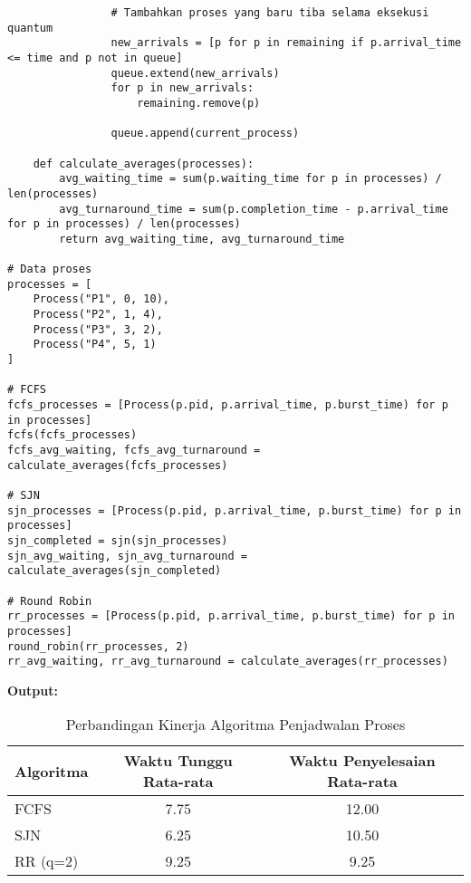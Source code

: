 \documentclass[12pt]{article}
\begin{document}
\begin{lstlisting}
                # Tambahkan proses yang baru tiba selama eksekusi quantum
                new_arrivals = [p for p in remaining if p.arrival_time <= time and p not in queue]
                queue.extend(new_arrivals)
                for p in new_arrivals:
                    remaining.remove(p)
                
                queue.append(current_process)

    def calculate_averages(processes):
        avg_waiting_time = sum(p.waiting_time for p in processes) / len(processes)
        avg_turnaround_time = sum(p.completion_time - p.arrival_time for p in processes) / len(processes)
        return avg_waiting_time, avg_turnaround_time

# Data proses
processes = [
    Process("P1", 0, 10),
    Process("P2", 1, 4),
    Process("P3", 3, 2),
    Process("P4", 5, 1)
]

# FCFS
fcfs_processes = [Process(p.pid, p.arrival_time, p.burst_time) for p in processes]
fcfs(fcfs_processes)
fcfs_avg_waiting, fcfs_avg_turnaround = calculate_averages(fcfs_processes)

# SJN
sjn_processes = [Process(p.pid, p.arrival_time, p.burst_time) for p in processes]
sjn_completed = sjn(sjn_processes)
sjn_avg_waiting, sjn_avg_turnaround = calculate_averages(sjn_completed)

# Round Robin
rr_processes = [Process(p.pid, p.arrival_time, p.burst_time) for p in processes]
round_robin(rr_processes, 2)
rr_avg_waiting, rr_avg_turnaround = calculate_averages(rr_processes)
\end{lstlisting}

\textbf{Output:}

\begin{table}[h]
    \centering
    \begin{tabular}{|l|c|c|}
    \hline
    \textbf{Algoritma} & \textbf{Waktu Tunggu Rata-rata} & \textbf{Waktu Penyelesaian Rata-rata} \\
    \hline
    FCFS               & 7.75                           & 12.00                                \\
    SJN                & 6.25                           & 10.50                                \\
    RR (q=2)           & 9.25                           & 9.25                                 \\
    \hline
    \end{tabular}
    \caption{Perbandingan Kinerja Algoritma Penjadwalan Proses}
    \label{tabel:penjadwalan}
\end{table}
\end{document}
